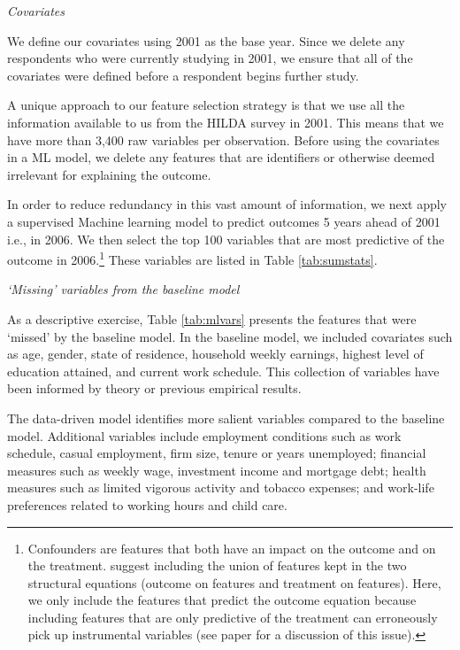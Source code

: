 \documentclass[12pt, a4paper]{article}
\begin{document}
\emph{Covariates}

We define our covariates using 2001 as the base year. Since we delete any respondents who were currently studying in 2001, we ensure that all of the covariates were defined before a respondent begins further study.

A unique approach to our feature selection strategy is that we use all the information available to us from the HILDA survey in 2001. This means that we have more than 3,400 raw variables per observation. Before using the covariates in a ML model, we delete any features that are identifiers or otherwise deemed irrelevant for explaining the outcome.

In order to reduce redundancy in this vast amount of information, we next apply a supervised Machine learning model to predict outcomes 5 years ahead of 2001 i.e., in 2006. We then select the top 100 variables that are most predictive of the outcome in 2006.\footnote{Confounders are features that both have an impact on the outcome and on the treatment. \cite{cherno2018} suggest including the union of features kept in the two structural equations (outcome on features and treatment on features). Here, we only include the features that predict the outcome equation because including features that are only predictive of the treatment can erroneously pick up instrumental variables (see \color{red} paper \color{black} for a discussion of this issue). } These variables are listed in Table \ref{tab:sumstats}. 

\emph{`Missing' variables from the baseline model}

As a descriptive exercise, Table \ref{tab:mlvars} presents the features that were ‘missed’ by the baseline model. In the baseline model, we included covariates such as age, gender, state of residence, household weekly earnings, highest level of education attained, and current work schedule. This collection of variables have been informed by theory or previous empirical results.  

The data-driven model identifies more salient variables compared to the baseline model. Additional variables include employment conditions such as work schedule, casual employment, firm size, tenure or years unemployed; financial measures such as weekly wage, investment income and mortgage debt; health measures such as limited vigorous activity and tobacco expenses; and work-life preferences related to working hours and child care. 
\end{document}
